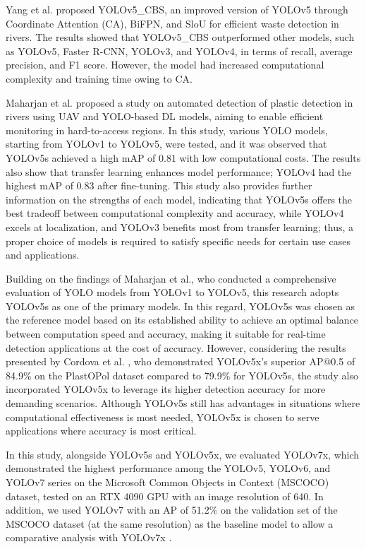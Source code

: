 \documentclass{ieeeaccess}
\begin{document}
Yang et al. \cite{Yang2022DetectionOR} proposed YOLOv5\_CBS, an improved version of YOLOv5 through Coordinate Attention (CA), BiFPN, and SloU for efficient waste detection in rivers. The results showed that YOLOv5\_CBS outperformed other models, such as YOLOv5, Faster R-CNN, YOLOv3, and YOLOv4, in terms of recall, average precision, and F1 score. However, the model had increased computational complexity and training time owing to CA.

Maharjan et al. \cite{Maharjan2022DetectionOR} proposed a study on automated detection of plastic detection in rivers using UAV and YOLO-based DL models, aiming to enable efficient monitoring in hard-to-access regions. In this study, various YOLO models, starting from YOLOv1 to YOLOv5, were tested, and it was observed that YOLOv5s achieved a high mAP of 0.81 with low computational costs. The results also show that transfer learning enhances model performance; YOLOv4 had the highest mAP of 0.83 after fine-tuning. This study also provides further information on the strengths of each model, indicating that YOLOv5s offers the best tradeoff between computational complexity and accuracy, while YOLOv4 excels at localization, and YOLOv3 benefits most from transfer learning; thus, a proper choice of models is required to satisfy specific needs for certain use cases and applications.

Building on the findings of Maharjan et al., who conducted a comprehensive evaluation of YOLO models from YOLOv1 to YOLOv5, this research adopts YOLOv5s as one of the primary models. In this regard, YOLOv5s was chosen as the reference model based on its established ability to achieve an optimal balance between computation speed and accuracy, making it suitable for real-time detection applications at the cost of accuracy. However, considering the results presented by Cordova et al. \cite{Neira2022LitterDW}, who demonstrated YOLOv5x's superior AP@0.5 of 84.9\% on the PlastOPol dataset compared to 79.9\% for YOLOv5s, the study also incorporated YOLOv5x to leverage its higher detection accuracy for more demanding scenarios. Although YOLOv5s still has advantages in situations where computational effectiveness is most needed, YOLOv5x is chosen to serve applications where accuracy is most critical.

In this study, alongside YOLOv5s and YOLOv5x, we evaluated YOLOv7x, which demonstrated the highest performance among the YOLOv5, YOLOv6, and YOLOv7 series on the Microsoft Common Objects in Context (MSCOCO) dataset, tested on an RTX 4090 GPU with an image resolution of 640. In addition, we used YOLOv7 with an AP of 51.2\% on the validation set of the MSCOCO dataset (at the same resolution) as the baseline model to allow a comparative analysis with YOLOv7x \cite{Wang2022YOLOv7TB}.
\end{document}
